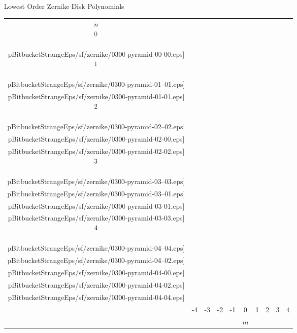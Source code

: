 \begin{frame}{Lowest Order Zernike Disk Polynomials}
    \centering
  	\setlength\extrarowheight{-6pt}
    \setlength{\tabcolsep}{3pt}       %
    \begin{tabular}{cccccccccc}
				$n$ \\
 				$\raisebox{12pt}{0}$  &
        & & & & \texttt{[image: \\pBitbucketStrangeEps/sf/zernike/0300-pyramid-00-00.eps]} & & & & \\[-4pt]
 				$\raisebox{12pt}{1}$  &
        & & & \texttt{[image: \\pBitbucketStrangeEps/sf/zernike/0300-pyramid-01--01.eps]} &
        & \texttt{[image: \\pBitbucketStrangeEps/sf/zernike/0300-pyramid-01-01.eps]} & & & \\[-4pt]
 				$\raisebox{12pt}{2}$  &
        & & \texttt{[image: \\pBitbucketStrangeEps/sf/zernike/0300-pyramid-02--02.eps]} &
        & \texttt{[image: \\pBitbucketStrangeEps/sf/zernike/0300-pyramid-02-00.eps]} &
        & \texttt{[image: \\pBitbucketStrangeEps/sf/zernike/0300-pyramid-02-02.eps]} & & \\[-4pt]
 				$\raisebox{12pt}{3}$  &
        & \texttt{[image: \\pBitbucketStrangeEps/sf/zernike/0300-pyramid-03--03.eps]} &
        & \texttt{[image: \\pBitbucketStrangeEps/sf/zernike/0300-pyramid-03--01.eps]} &
        & \texttt{[image: \\pBitbucketStrangeEps/sf/zernike/0300-pyramid-03-01.eps]} &
        & \texttt{[image: \\pBitbucketStrangeEps/sf/zernike/0300-pyramid-03-03.eps]} & \\[-4pt]
				$\raisebox{12pt}{4}$  &
        \texttt{[image: \\pBitbucketStrangeEps/sf/zernike/0300-pyramid-04--04.eps]} &
        & \texttt{[image: \\pBitbucketStrangeEps/sf/zernike/0300-pyramid-04--02.eps]} &
        & \texttt{[image: \\pBitbucketStrangeEps/sf/zernike/0300-pyramid-04-00.eps]} &
        & \texttt{[image: \\pBitbucketStrangeEps/sf/zernike/0300-pyramid-04-02.eps]} &
        & \texttt{[image: \\pBitbucketStrangeEps/sf/zernike/0300-pyramid-04-04.eps]} \\[10pt]
 				& -4 & -3 & -2 & -1 & 0 & 1 & 2 & 3 & 4 \\
				&&&&& $m$
    \end{tabular}
\end{frame}

